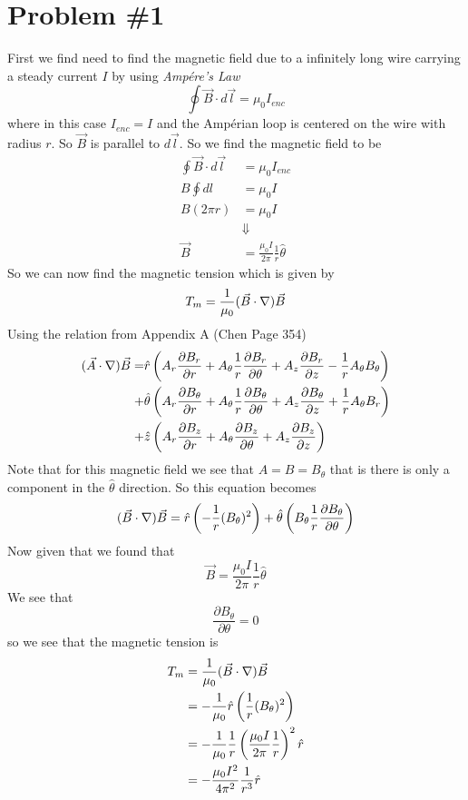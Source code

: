 \documentclass[11pt]{article}
\numberwithin{equation}{section}
\newcommand{\grad}{\bold\nabla}
\begin{document}


\section{Problem \#1}
First we find need to find the magnetic field due to a infinitely long wire carrying a steady current $I$ by using \emph{Amp\'{e}re's Law}
$$\oint \vec{B}\cdot d\vec{l} = \mu_0 I_{enc}$$
where in this case $I_{enc} = I$ and the Amp\'{e}rian loop is centered on the wire with radius $r$. So $\vec{B}$ is parallel to $d\vec{l}$. So we find the magnetic field to be
\begin{align*}
\oint \vec{B}\cdot d\vec{l} &= \mu_0 I_{enc}\\
B\oint dl &= \mu_0 I\\
B(2\pi r) &= \mu_0 I\\
&\Downarrow\\
\vec{B} &= \frac{\mu_0 I}{2\pi}\frac{1}{r}\hat{\theta}
\end{align*}
So we can now find the magnetic tension which is given by
$$T_m = \frac{1}{\mu_0}(\vec{B}\cdot\grad)\vec{B}$$
Using the relation from Appendix A (Chen Page 354) 
\begin{align*}
(\vec{A}\cdot\grad)\vec{B} = &\hat{r}\left(A_r\frac{\partial B_r}{\partial r} + A_{\theta}\frac{1}{r}\frac{\partial B_r}{\partial\theta} + A_z\frac{\partial B_r}{\partial z} - \frac{1}{r}A_{\theta} B_{\theta}\right)\\
+ &\hat{\theta}\left(A_r\frac{\partial B_{\theta}}{\partial r} + A_{\theta}\frac{1}{r}\frac{\partial B_{\theta}}{\partial\theta} + A_z\frac{\partial B_{\theta}}{\partial z} + \frac{1}{r} A_{\theta}B_{r}\right)\\
+ &\hat{z}\left(A_r\frac{\partial B_z}{\partial r}+A_{\theta}\frac{\partial B_z}{\partial \theta}+A_z\frac{\partial B_z}{\partial z}\right)
\end{align*}
Note that for this magnetic field we see that $A = B = B_{\theta}$ that is there is only a component in the $\hat{\theta}$ direction. So this equation becomes
$$(\vec{B}\cdot\grad)\vec{B} = \hat{r}\left(-\frac{1}{r}(B_{\theta})^2\right) 
+ \hat{\theta}\left(B_{\theta}\frac{1}{r}\frac{\partial B_{\theta}}{\partial\theta}\right)$$
Now given that we found that
$$\vec{B} = \frac{\mu_0 I}{2\pi}\frac{1}{r}\hat{\theta}$$
We see that 
$$\frac{\partial B_{\theta}}{\partial \theta} = 0$$ so we see that the magnetic tension is
\begin{align*}
T_m &= \frac{1}{\mu_0}(\vec{B}\cdot\grad)\vec{B}\\
&= -\frac{1}{\mu_0}\hat{r}\left(\frac{1}{r}(B_{\theta})^2\right)\\
&= -\frac{1}{\mu_0}\frac{1}{r}\left(\frac{\mu_0 I}{2\pi}\frac{1}{r}\right)^2\hat{r}\\
&= -\frac{\mu_0I^2}{4\pi^2}\frac{1}{r^3} \hat{r}
\end{align*}
\end{document}
